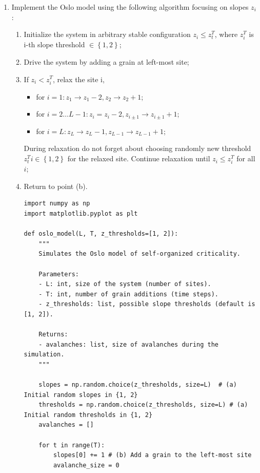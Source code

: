 \documentclass[10pt,letterpaper, onecolumn]{report}
\begin{document}
\begin{flushleft}
    \begin{enumerate}
        \item Implement the Oslo model using the following algorithm focusing on slopes $z_{i}$ :
        \begin{enumerate}
            \item Initialize the system in arbitrary stable configuration $z_{i} \leqslant z_{t}^T$, where $z_{i}^T$ is i-th slope threshold $ \in \left\{ 1,2 \right\}$;
            \item Drive the system by adding a grain at left-most site;
            \item If $z_{i} < z_{i}^T$, relax the site i,
            \begin{itemize}
                \item[] for $i=1: z_{1} \to z_{1} - 2, z_{2} \to z_{2} + 1$;
                \item[] for $i=2 \dots L-1: z_{i} = z_{i} - 2, z_{i \pm 1} \to z_{i \pm 1} + 1$;
                \item[] for $i=L: z_{L} \to z_{L} - 1, z_{L-1} \to z_{L-1} + 1$;
            \end{itemize}
            During relaxation do not forget about choosing randomly new threshold $z_{t}^T i \in \left\{ 1,2 \right\}$ for the relaxed site. Continue relaxation until $ z_{i} \leqslant z_{i}^T$ for all $i$;
            \item Return to point (b).
            \hfill\break
            \begin{lstlisting}[style=myPythonStyle, caption={Oslo Model Algorithm (Python version 3.11.7)}]
import numpy as np
import matplotlib.pyplot as plt

def oslo_model(L, T, z_thresholds=[1, 2]):
    """
    Simulates the Oslo model of self-organized criticality.

    Parameters:
    - L: int, size of the system (number of sites).
    - T: int, number of grain additions (time steps).
    - z_thresholds: list, possible slope thresholds (default is [1, 2]).

    Returns:
    - avalanches: list, size of avalanches during the simulation.
    """

    slopes = np.random.choice(z_thresholds, size=L)  # (a) Initial random slopes in {1, 2}
    thresholds = np.random.choice(z_thresholds, size=L) # (a) Initial random thresholds in {1, 2}
    avalanches = []

    for t in range(T):
        slopes[0] += 1 # (b) Add a grain to the left-most site
        avalanche_size = 0


\end{lstlisting}
\end{enumerate}
\end{enumerate}
\end{flushleft}
\end{document}
